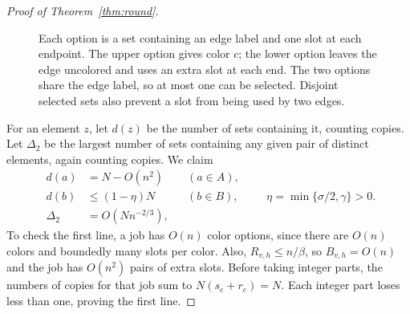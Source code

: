 \documentclass[11pt]{article}
\theoremstyle{definition}\newtheorem{algorithm}{Algorithm}[section]
\numberwithin{equation}{section}
\theoremstyle{remark}\newtheorem*{remark}{Remark}
\begin{document}
\begin{proof}[Proof of Theorem~\ref{thm:round}]
\begin{figure}[htbp]
\centering
{}
\caption{Each option is a set containing an edge label and one slot at each
endpoint. The upper option gives color $c$; the lower option leaves the
edge uncolored and uses an extra slot at each end. The two options share
the edge label, so at most one can be selected. Disjoint selected sets
also prevent a slot from being used by two edges.}
\label{fig:matching-options}
\end{figure}


For an element $z$, let $d(z)$ be the number of sets containing it,
counting copies. Let $\Delta_2$ be the largest number of sets containing
any given pair of distinct elements, again counting copies. We claim
\begin{equation}\label{eq:degrees}
 \begin{aligned}
 d(a)&=N-O(n^2) &&(a\in A),\\
 d(b)&\le(1-\eta)N &&(b\in B),\\
 \Delta_2&=O(Nn^{-2/3}),
 \end{aligned}
 \qquad \eta=\min\{\sigma/2,\gamma\}>0.
\end{equation}
To check the first line, a job has $O(n)$ color options, since there
are $O(n)$ colors and boundedly many slots per color. Also,
$R_{v,h}\le n/\beta$, so $B_{v,h}=O(n)$ and the job has $O(n^2)$
pairs of extra slots. Before taking integer parts, the numbers of copies
for that job sum to $N(s_e+r_e)=N$. Each integer part loses less than
one, proving the first line.


\end{proof}
\end{document}
